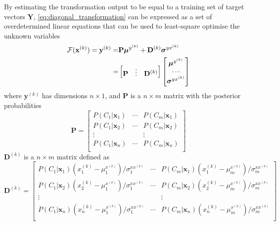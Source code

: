By estimating the transformation output to be equal to a training set of target vectors $\mathbf{Y}$, \eqref{eq:diagonal_transformation} can be expressed as a set of overdetermined linear equations that can be used to least-square optimise the unknown variables \cite{stylianou98}
\begin{equation}
	\label{eq:least_square_problem}
	\begin{split}
		\mathcal F(\mathbf{x}^{(k)}) = \mathbf{y}^{(k)} =  & \mathbf{P}\boldsymbol{\mu}^{y^{(k)}} + \mathbf{D}^{(k)}\boldsymbol{\sigma}^{yx^{(k)}} \\
		= & \begin{bmatrix}
			\mathbf{P}& \vdots &\mathbf{D}^{(k)}
		\end{bmatrix}
		\begin{bmatrix}
			\boldsymbol{\mu}^{y^{(k)}} \\
			\cdots \\
			\boldsymbol{\sigma}^{yx^{(k)}}
		\end{bmatrix}
	\end{split}
\end{equation}
where $\mathbf{y}^{(k)}$ has dimensions $n\times 1$, and $\mathbf{P}$ is a $n \times m$ matrix with the posterior probabilities
\begin{equation}
	\label{eq:P_matrix}
	\mathbf{P} = \begin{bmatrix}
		P(C_1\vert \mathbf{x}_1) & \cdots & P(C_m\vert \mathbf{x}_1) \\
		P(C_1\vert \mathbf{x}_2) & \cdots & P(C_m\vert \mathbf{x}_2) \\
		\vdots & & \vdots \\
		P(C_1\vert \mathbf{x}_n) & \cdots & P(C_m\vert \mathbf{x}_n) \\
	\end{bmatrix}
\end{equation}
$\mathbf{D}^{(k)}$ is a $n \times m$ matrix defined as
\begin{equation}
	\label{eq:D_matrix_new}
	\mathbf{D}^{(k)} = \begin{bmatrix}
		P(C_1\vert \mathbf{x}_1) (x_1^{(k)} - \mu_1^{x^{(k)}})/\sigma_1^{xx^{(k)}} & \cdots & P(C_m\vert \mathbf{x}_1) (x_1^{(k)} - \mu_m^{x^{(k)}})/\sigma_m^{xx^{(k)}} \\
		P(C_1\vert \mathbf{x}_2) (x_2^{(k)} - \mu_1^{x^{(k)}})/\sigma_1^{xx^{(k)}} & \cdots & P(C_m\vert \mathbf{x}_2) (x_2^{(k)} - \mu_m^{x^{(k)}})/\sigma_m^{xx^{(k)}} \\
		\vdots & & \vdots \\
		P(C_1\vert \mathbf{x}_n) (x_n^{(k)} - \mu_1^{x^{(k)}})/\sigma_1^{xx^{(k)}} & \cdots & P(C_m\vert \mathbf{x}_n) (x_n^{(k)} - \mu_m^{x^{(k)}})/\sigma_m^{xx^{(k)}} \\
	\end{bmatrix}
\end{equation}

